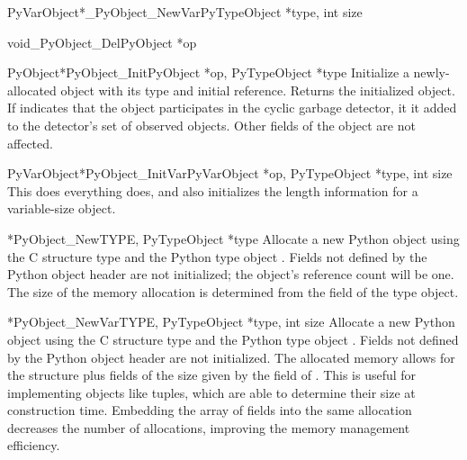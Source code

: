 \documentclass{manual}
\begin{document}
\begin{cfuncdesc}{PyVarObject*}{_PyObject_NewVar}{PyTypeObject *type, int size}
\end{cfuncdesc}

\begin{cfuncdesc}{void}{_PyObject_Del}{PyObject *op}
\end{cfuncdesc}

\begin{cfuncdesc}{PyObject*}{PyObject_Init}{PyObject *op,
					    PyTypeObject *type}
  Initialize a newly-allocated object  with its type and
  initial reference.  Returns the initialized object.  If 
  indicates that the object participates in the cyclic garbage
  detector, it it added to the detector's set of observed objects.
  Other fields of the object are not affected.
\end{cfuncdesc}

\begin{cfuncdesc}{PyVarObject*}{PyObject_InitVar}{PyVarObject *op,
						  PyTypeObject *type, int size}
  This does everything  does, and also
  initializes the length information for a variable-size object.
\end{cfuncdesc}

\begin{cfuncdesc}{*}{PyObject_New}{TYPE, PyTypeObject *type}
  Allocate a new Python object using the C structure type 
  and the Python type object .  Fields not defined by the
  Python object header are not initialized; the object's reference
  count will be one.  The size of the memory
  allocation is determined from the  field of the
  type object.
\end{cfuncdesc}

\begin{cfuncdesc}{*}{PyObject_NewVar}{TYPE, PyTypeObject *type,
                                                int size}
  Allocate a new Python object using the C structure type 
  and the Python type object .  Fields not defined by the
  Python object header are not initialized.  The allocated memory
  allows for the  structure plus  fields of the
  size given by the  field of .  This is
  useful for implementing objects like tuples, which are able to
  determine their size at construction time.  Embedding the array of
  fields into the same allocation decreases the number of allocations,
  improving the memory management efficiency.
\end{cfuncdesc}
\end{document}
